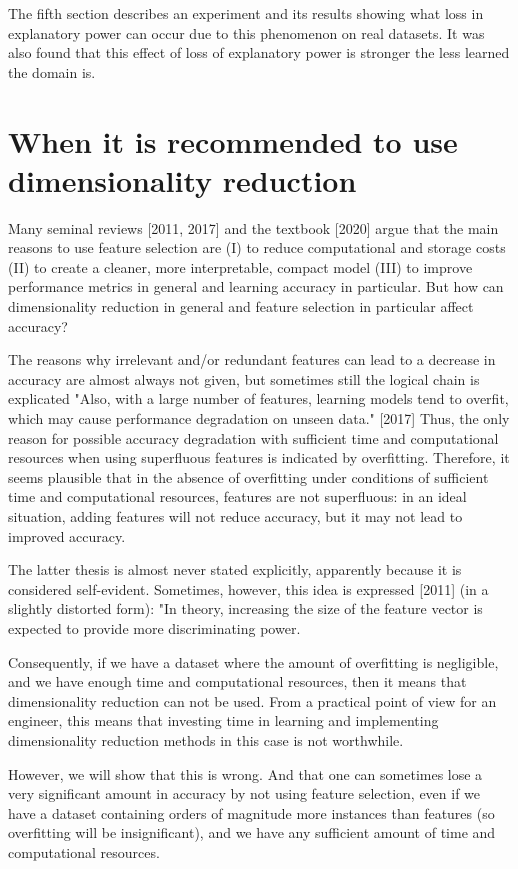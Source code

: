 \documentclass[12pt]{a&t}
\begin{document}
The fifth section describes an experiment and its results showing what loss in explanatory power can occur due to this phenomenon on real datasets. It was also found that this effect of loss of explanatory power is stronger the less learned the domain is.

\section{When it is recommended to use dimensionality reduction }

Many seminal reviews [2011, 2017] and the textbook [2020] argue that the main reasons to use feature selection are (I) to reduce computational and storage costs (II) to create a cleaner, more interpretable, compact model (III) to improve performance metrics in general and learning accuracy in particular. But how can dimensionality reduction in general and feature selection in particular affect accuracy? 

The reasons why irrelevant and/or redundant features can lead to a decrease in accuracy are almost always not given, but sometimes still the logical chain is explicated "Also, with a large number of features, learning models tend to overfit, which may cause performance degradation on unseen data." [2017] Thus, the only reason for possible accuracy degradation with sufficient time and computational resources when using superfluous features is indicated by overfitting. Therefore, it seems plausible that in the absence of overfitting under conditions of sufficient time and computational resources, features are not superfluous: in an ideal situation, adding features will not reduce accuracy, but it may not lead to improved accuracy. 

The latter thesis is almost never stated explicitly, apparently because it is considered self-evident. 
Sometimes, however, this idea is expressed [2011] (in a slightly distorted form): "In theory, increasing the size of the feature vector is expected to provide more discriminating power.

Consequently, if we have a dataset where the amount of overfitting is negligible, and we have enough time and computational resources, then it means that dimensionality reduction can not be used. From a practical point of view for an engineer, this means that investing time in learning and implementing dimensionality reduction methods in this case is not worthwhile. 

However, we will show that this is wrong. And that one can sometimes lose a very significant amount in accuracy by not using feature selection, even if we have a dataset containing orders of magnitude more instances than features (so overfitting will be insignificant), and we have any sufficient amount of time and computational resources.
\end{document}
